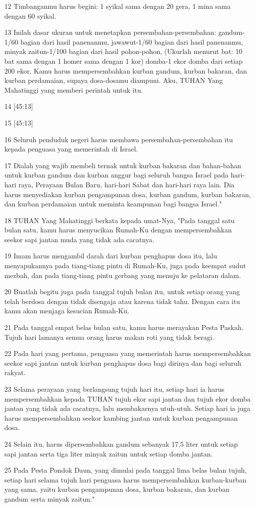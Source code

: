 \par 12 Timbanganmu harus begini: 1 syikal sama dengan 20 gera, 1 mina sama dengan 60 syikal.
\par 13 Inilah dasar ukuran untuk menetapkan persembahan-persembahan: gandum-1/60 bagian dari hasil panenanmu, jawawut-1/60 bagian dari hasil panenanmu, minyak zaitun-1/100 bagian dari hasil pohon-pohon, (Ukurlah menurut bat: 10 bat sama dengan 1 homer sama dengan 1 kor) domba-1 ekor domba dari setiap 200 ekor. Kamu harus mempersembahkan kurban gandum, kurban bakaran, dan kurban perdamaian, supaya dosa-dosamu diampuni. Aku, TUHAN Yang Mahatinggi yang memberi perintah untuk itu.
\par 14 [45:13]
\par 15 [45:13]
\par 16 Seluruh penduduk negeri harus membawa persembahan-persembahan itu kepada penguasa yang memerintah di Israel.
\par 17 Dialah yang wajib membeli ternak untuk kurban bakaran dan bahan-bahan untuk kurban gandum dan kurban anggur bagi seluruh bangsa Israel pada hari-hari raya, Perayaan Bulan Baru, hari-hari Sabat dan hari-hari raya lain. Dia harus menyediakan kurban pengampunan dosa, kurban gandum, kurban bakaran, dan kurban perdamaian untuk meminta keampunan bagi bangsa Israel."
\par 18 TUHAN Yang Mahatinggi berkata kepada umat-Nya, "Pada tanggal satu bulan satu, kamu harus menyucikan Rumah-Ku dengan mempersembahkan seekor sapi jantan muda yang tidak ada cacatnya.
\par 19 Imam harus mengambil darah dari kurban penghapus dosa itu, lalu menyapukannya pada tiang-tiang pintu di Rumah-Ku, juga pada keempat sudut mezbah, dan pada tiang-tiang pintu gerbang yang menuju ke pelataran dalam.
\par 20 Buatlah begitu juga pada tanggal tujuh bulan itu, untuk setiap orang yang telah berdosa dengan tidak disengaja atau karena tidak tahu. Dengan cara itu kamu akan menjaga kesucian Rumah-Ku.
\par 21 Pada tanggal empat belas bulan satu, kamu harus merayakan Pesta Paskah. Tujuh hari lamanya semua orang harus makan roti yang tidak beragi.
\par 22 Pada hari yang pertama, penguasa yang memerintah harus mempersembahkan seekor sapi jantan untuk kurban penghapus dosa bagi dirinya dan bagi seluruh rakyat.
\par 23 Selama perayaan yang berlangsung tujuh hari itu, setiap hari ia harus mempersembahkan kepada TUHAN tujuh ekor sapi jantan dan tujuh ekor domba jantan yang tidak ada cacatnya, lalu membakarnya utuh-utuh. Setiap hari ia juga harus mempersembahkan seekor kambing jantan untuk kurban pengampunan dosa.
\par 24 Selain itu, harus dipersembahkan gandum sebanyak 17,5 liter untuk setiap sapi jantan serta tiga liter minyak zaitun untuk setiap domba jantan.
\par 25 Pada Pesta Pondok Daun, yang dimulai pada tanggal lima belas bulan tujuh, setiap hari selama tujuh hari penguasa harus mempersembahkan kurban-kurban yang sama, yaitu kurban pengampunan dosa, kurban bakaran, dan kurban gandum serta minyak zaitun."


